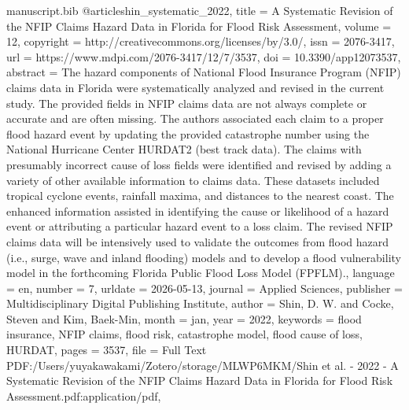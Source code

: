 \begin{filecontents*}[force]{manuscript.bib}
@article{shin_systematic_2022,
	title = {A {Systematic} {Revision} of the {NFIP} {Claims} {Hazard} {Data} in {Florida} for {Flood} {Risk} {Assessment}},
	volume = {12},
	copyright = {http://creativecommons.org/licenses/by/3.0/},
	issn = {2076-3417},
	url = {https://www.mdpi.com/2076-3417/12/7/3537},
	doi = {10.3390/app12073537},
	abstract = {The hazard components of National Flood Insurance Program (NFIP) claims data in Florida were systematically analyzed and revised in the current study. The provided fields in NFIP claims data are not always complete or accurate and are often missing. The authors associated each claim to a proper flood hazard event by updating the provided catastrophe number using the National Hurricane Center HURDAT2 (best track data). The claims with presumably incorrect cause of loss fields were identified and revised by adding a variety of other available information to claims data. These datasets included tropical cyclone events, rainfall maxima, and distances to the nearest coast. The enhanced information assisted in identifying the cause or likelihood of a hazard event or attributing a particular hazard event to a loss claim. The revised NFIP claims data will be intensively used to validate the outcomes from flood hazard (i.e., surge, wave and inland flooding) models and to develop a flood vulnerability model in the forthcoming Florida Public Flood Loss Model (FPFLM).},
	language = {en},
	number = {7},
	urldate = {2026-05-13},
	journal = {Applied Sciences},
	publisher = {Multidisciplinary Digital Publishing Institute},
	author = {Shin, D. W. and Cocke, Steven and Kim, Baek-Min},
	month = jan,
	year = {2022},
	keywords = {flood insurance, NFIP claims, flood risk, catastrophe model, flood cause of loss, HURDAT},
	pages = {3537},
	file = {Full Text PDF:/Users/yuyakawakami/Zotero/storage/MLWP6MKM/Shin et al. - 2022 - A Systematic Revision of the NFIP Claims Hazard Data in Florida for Flood Risk Assessment.pdf:application/pdf},
}



\end{filecontents*}
